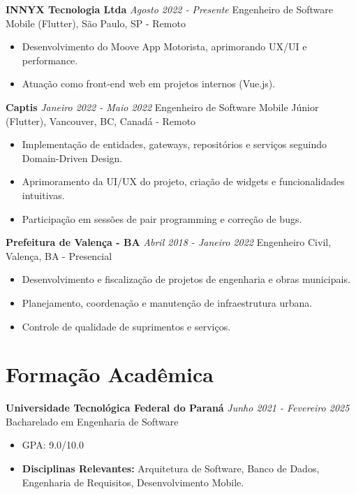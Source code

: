 \documentclass[10pt, letterpaper]{article}
\begin{document}
\textbf{INNYX Tecnologia Ltda} \hfill \textit{Agosto 2022 - Presente}\newline
Engenheiro de Software Mobile (Flutter), São Paulo, SP  - Remoto
\begin{itemize}
    \item Desenvolvimento do Moove App Motorista, aprimorando UX/UI e performance.
    \item Atuação como front-end web em projetos internos (Vue.js).
\end{itemize}

\textbf{Captis} \hfill \textit{Janeiro 2022 - Maio 2022}\newline
Engenheiro de Software Mobile Júnior (Flutter), Vancouver, BC, Canadá - Remoto
\begin{itemize}
    \item Implementação de entidades, gateways, repositórios e serviços seguindo Domain-Driven Design.
    \item Aprimoramento da UI/UX do projeto, criação de widgets e funcionalidades intuitivas.
    \item Participação em sessões de pair programming e correção de bugs.
\end{itemize}

\textbf{Prefeitura de Valença - BA} \hfill \textit{Abril 2018 - Janeiro 2022}\newline
Engenheiro Civil, Valença, BA  - Presencial
\begin{itemize}
    \item Desenvolvimento e fiscalização de projetos de engenharia e obras municipais.
    \item Planejamento, coordenação e manutenção de infraestrutura urbana.
    \item Controle de qualidade de suprimentos e serviços.
\end{itemize}

\section{Formação Acadêmica}
\textbf{Universidade Tecnológica Federal do Paraná} \hfill \textit{Junho 2021 - Fevereiro 2025}\newline
Bacharelado em Engenharia de Software
\begin{itemize}
    \item GPA: 9.0/10.0
    \item \textbf{Disciplinas Relevantes:} Arquitetura de Software, Banco de Dados, Engenharia de Requisitos, Desenvolvimento Mobile.
\end{itemize}
\end{document}
